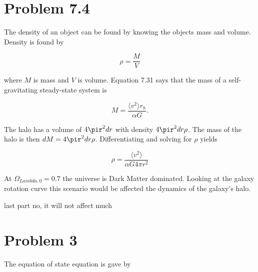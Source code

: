 \documentclass[12pt]{article}
\begin{document}
\section*{Problem 7.4}

The density of an object can be found by knowing the objects mass and volume. Density is found by

$$
\rho = \frac{M}{V}
$$

where $M$ is mass and $V$ is volume. Equation 7.31 says that the mass of a self-gravitating steady-state system is 

$$
M = \frac{\langle v^2 \rangle r_{h}}{\alpha G}.
$$

The halo has a volume of $4\pir^{2}dr$ with density $4\pir^{2}dr \rho$. The mass of the halo is then $dM = 4\pir^{2}dr \rho$. Differentiating and solving for $\rho$ yields 

$$
\rho = \frac{\langle v^2 \rangle}{\alpha G 4\pi r^{2}}
$$

At $\Omega_{Lambda, 0} = 0.7$ the universe is Dark Matter dominated. Looking at the galaxy rotation curve this scenario would be affected the dynamics of the galaxy's halo.

last part no, it will not affect much

\section*{Problem 3}

The equation of state equation is gave by
\end{document}
